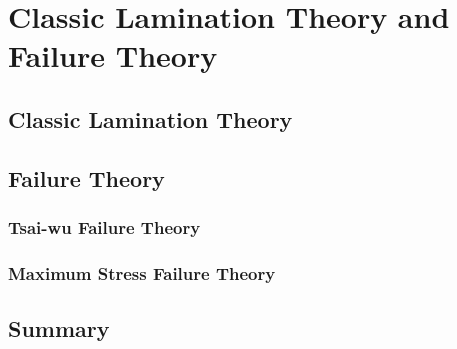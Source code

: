 
\chapter{Classic Lamination Theory and Failure Theory} %

\label{Chapter2} %


\section{Classic Lamination Theory}


\section{Failure Theory}
\subsection{Tsai-wu Failure Theory}
\subsection{Maximum Stress Failure Theory}

\section{Summary}
